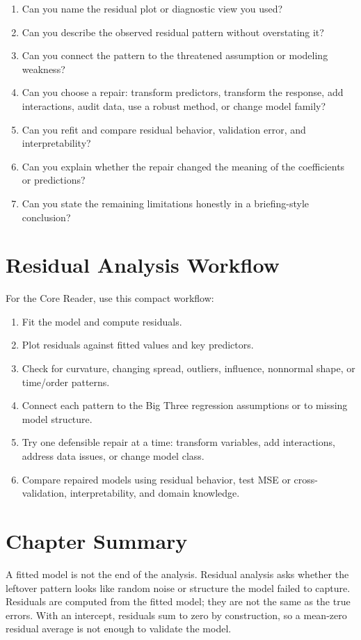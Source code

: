 {\begin{enumerate}
  \item Can you name the residual plot or diagnostic view you used?
  \item Can you describe the observed residual pattern without overstating it?
  \item Can you connect the pattern to the threatened assumption or modeling weakness?
  \item Can you choose a repair: transform predictors, transform the response, add interactions, audit data, use a robust method, or change model family?
  \item Can you refit and compare residual behavior, validation error, and interpretability?
  \item Can you explain whether the repair changed the meaning of the coefficients or predictions?
  \item Can you state the remaining limitations honestly in a briefing-style conclusion?
\end{enumerate}
}{
\section{Residual Analysis Workflow}

For the Core Reader, use this compact workflow:
\begin{enumerate}
  \item Fit the model and compute residuals.
  \item Plot residuals against fitted values and key predictors.
  \item Check for curvature, changing spread, outliers, influence, nonnormal shape, or time/order patterns.
  \item Connect each pattern to the Big Three regression assumptions or to missing model structure.
  \item Try one defensible repair at a time: transform variables, add interactions, address data issues, or change model class.
  \item Compare repaired models using residual behavior, test MSE or cross-validation, interpretability, and domain knowledge.
\end{enumerate}

\section{Chapter Summary}

A fitted model is not the end of the analysis.  Residual analysis asks whether the leftover pattern looks like random noise or structure the model failed to capture.  Residuals are computed from the fitted model; they are not the same as the true errors.  With an intercept, residuals sum to zero by construction, so a mean-zero residual average is not enough to validate the model.

}
